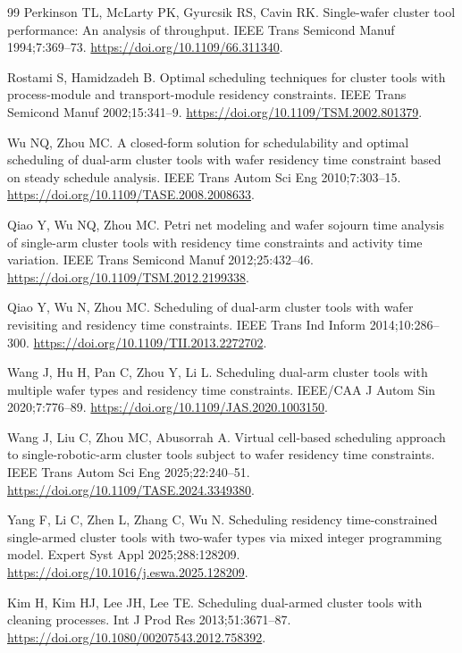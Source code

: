 \documentclass[final,5p,times,twocolumn]{elsarticle}
\begin{document}
\begin{thebibliography}{99}
Perkinson TL, McLarty PK, Gyurcsik RS, Cavin RK. Single-wafer cluster tool performance: An analysis of throughput.
IEEE Trans Semicond Manuf 1994;7:369--73.
\url{https://doi.org/10.1109/66.311340}.

Rostami S, Hamidzadeh B. Optimal scheduling techniques for cluster tools with process-module and transport-module residency constraints.
IEEE Trans Semicond Manuf 2002;15:341--9.
\url{https://doi.org/10.1109/TSM.2002.801379}.

Wu NQ, Zhou MC. A closed-form solution for schedulability and optimal scheduling of dual-arm cluster tools with wafer residency time constraint based on steady schedule analysis.
IEEE Trans Autom Sci Eng 2010;7:303--15.
\url{https://doi.org/10.1109/TASE.2008.2008633}.

Qiao Y, Wu NQ, Zhou MC. Petri net modeling and wafer sojourn time analysis of single-arm cluster tools with residency time constraints and activity time variation.
IEEE Trans Semicond Manuf 2012;25:432--46.
\url{https://doi.org/10.1109/TSM.2012.2199338}.

Qiao Y, Wu N, Zhou MC. Scheduling of dual-arm cluster tools with wafer revisiting and residency time constraints.
IEEE Trans Ind Inform 2014;10:286--300.
\url{https://doi.org/10.1109/TII.2013.2272702}.

Wang J, Hu H, Pan C, Zhou Y, Li L. Scheduling dual-arm cluster tools with multiple wafer types and residency time constraints.
IEEE/CAA J Autom Sin 2020;7:776--89.
\url{https://doi.org/10.1109/JAS.2020.1003150}.

Wang J, Liu C, Zhou MC, Abusorrah A. Virtual cell-based scheduling approach to single-robotic-arm cluster tools subject to wafer residency time constraints.
IEEE Trans Autom Sci Eng 2025;22:240--51.
\url{https://doi.org/10.1109/TASE.2024.3349380}.

Yang F, Li C, Zhen L, Zhang C, Wu N. Scheduling residency time-constrained single-armed cluster tools with two-wafer types via mixed integer programming model.
Expert Syst Appl 2025;288:128209.
\url{https://doi.org/10.1016/j.eswa.2025.128209}.

Kim H, Kim HJ, Lee JH, Lee TE. Scheduling dual-armed cluster tools with cleaning processes.
Int J Prod Res 2013;51:3671--87.
\url{https://doi.org/10.1080/00207543.2012.758392}.


\end{thebibliography}
\end{document}
